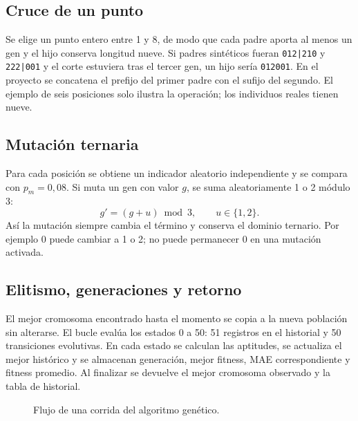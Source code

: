 \documentclass[11pt,letterpaper]{article}
\newcommand{\codigo}[1]{\texttt{\small #1}}
\begin{document}
\subsection{Cruce de un punto}
Se elige un punto entero entre 1 y 8, de modo que cada padre aporta al menos un gen y el hijo conserva longitud nueve. Si padres sintéticos fueran \codigo{012|210} y \codigo{222|001} y el corte estuviera tras el tercer gen, un hijo sería \codigo{012001}. En el proyecto se concatena el prefijo del primer padre con el sufijo del segundo. El ejemplo de seis posiciones solo ilustra la operación; los individuos reales tienen nueve.

\subsection{Mutación ternaria}
Para cada posición se obtiene un indicador aleatorio independiente y se compara con $p_m=0{,}08$. Si muta un gen con valor $g$, se suma aleatoriamente 1 o 2 módulo 3:
\begin{equation}
  g'=(g+u)\bmod 3,\qquad u\in\{1,2\}.
\end{equation}
Así la mutación siempre cambia el término y conserva el dominio ternario. Por ejemplo 0 puede cambiar a 1 o 2; no puede permanecer 0 en una mutación activada.

\subsection{Elitismo, generaciones y retorno}
El mejor cromosoma encontrado hasta el momento se copia a la nueva población sin alterarse. El bucle evalúa los estados 0 a 50: 51 registros en el historial y 50 transiciones evolutivas. En cada estado se calculan las aptitudes, se actualiza el mejor histórico y se almacenan generación, mejor fitness, MAE correspondiente y fitness promedio. Al finalizar se devuelve el mejor cromosoma observado y la tabla de historial.

\begin{figure}[H]
\centering
{}
\caption{Flujo de una corrida del algoritmo genético.}\label{fig:flujo-ga}
\end{figure}
\end{document}
